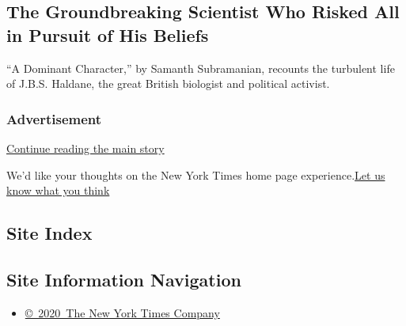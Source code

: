 \href{/2020/07/28/books/review/a-dominant-character-haldane-samanth-subramanian.html}{}

\hypertarget{the-groundbreaking-scientist-who-risked-all-in-pursuit-of-his-beliefs}{%
\subsection{The Groundbreaking Scientist Who Risked All in Pursuit of
His
Beliefs}\label{the-groundbreaking-scientist-who-risked-all-in-pursuit-of-his-beliefs}}

``A Dominant Character,'' by Samanth Subramanian, recounts the turbulent
life of J.B.S. Haldane, the great British biologist and political
activist.

\href{/2020/07/28/books/review/a-dominant-character-haldane-samanth-subramanian.html}{}

\hypertarget{advertisement}{%
\subsubsection{Advertisement}\label{advertisement}}

\protect\hyperlink{after-dfp-ad-mid1-large}{Continue reading the main
story}

We'd like your thoughts on the New York Times home page
experience.\href{http://nyt.qualtrics.com/jfe/form/SV_eFJmKj9v0krSE0l}{Let
us know what you think}

\hypertarget{site-index}{%
\subsection{Site Index}\label{site-index}}

\hypertarget{site-information-navigation}{%
\subsection{Site Information
Navigation}\label{site-information-navigation}}

\begin{itemize}
\tightlist
\item
  \href{https://help.nytimes3xbfgragh.onion/hc/en-us/articles/115014792127-Copyright-notice}{©~2020~The
  New York Times Company}
\end{itemize}


